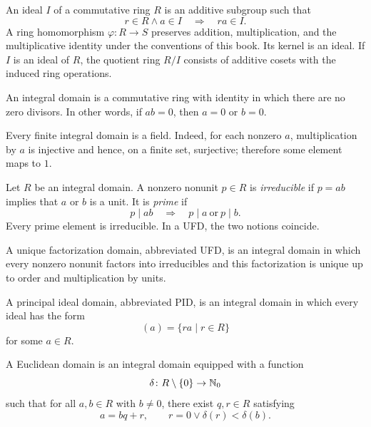     \begin{definition}
        An ideal $I$ of a commutative ring $R$ is an additive subgroup such that
        \[
            r\in R\land a\in I
            \quad\Longrightarrow\quad
            ra\in I.
        \]
        A ring homomorphism $\varphi\colon R\to S$ preserves addition,
        multiplication, and the multiplicative identity under the conventions
        of this book. Its kernel is an ideal. If $I$ is an ideal of $R$, the
        quotient ring $R/I$ consists of additive cosets with the induced ring
        operations.
    \end{definition}

    \begin{definition}
        An integral domain is a commutative ring with identity in which there are
        no zero divisors. In other words, if $ab=0$, then $a=0$ or $b=0$.
    \end{definition}

    \begin{theorem}
        Every finite integral domain is a field. Indeed, for each nonzero
        $a$, multiplication by $a$ is injective and hence, on a finite set,
        surjective; therefore some element maps to $1$.
    \end{theorem}

    \begin{definition}
        Let $R$ be an integral domain. A nonzero nonunit $p\in R$ is
        \emph{irreducible} if $p=ab$ implies that $a$ or $b$ is a unit. It is
        \emph{prime} if
        \[
            p\mid ab
            \quad\Longrightarrow\quad
            p\mid a\ \text{or}\ p\mid b.
        \]
        Every prime element is irreducible. In a UFD, the two notions coincide.
    \end{definition}

    \begin{definition}
        A unique factorization domain, abbreviated UFD, is an integral domain in
        which every nonzero nonunit factors into irreducibles and this
        factorization is unique up to order and multiplication by units.

        A principal ideal domain, abbreviated PID, is an integral domain in
        which every ideal has the form
        \[
            (a)=\{ra\mid r\in R\}
        \]
        for some $a\in R$.

        A Euclidean domain is an integral domain equipped with a function
        \[
            \delta\colon R\setminus\{0\}\to\mathbb{N}_0
        \]
        such that for all $a,b\in R$ with $b\neq0$, there exist $q,r\in R$
        satisfying
        \[
            a=bq+r,
            \qquad
            r=0\lor \delta(r)<\delta(b).
        \]
    \end{definition}

